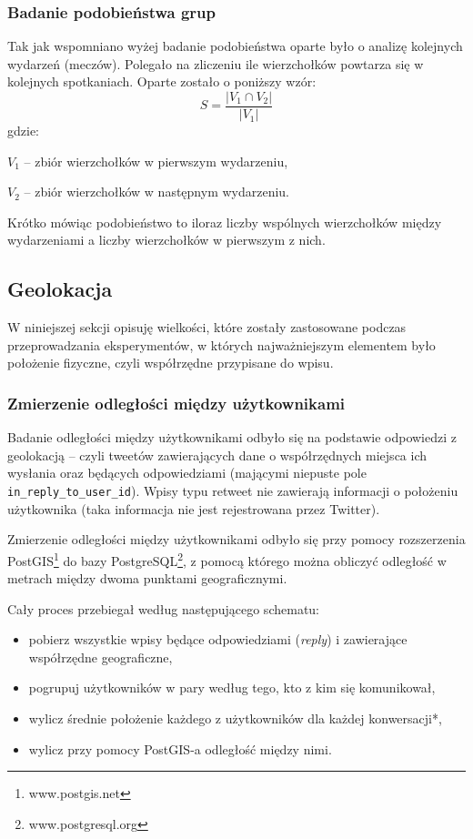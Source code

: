 \subsubsection{Badanie podobieństwa grup}
\label{subsection:badaniepodobienstwagrup}
Tak jak wspomniano wyżej badanie podobieństwa oparte było o analizę kolejnych
wydarzeń (meczów).
Polegało na zliczeniu ile wierzchołków powtarza się w kolejnych spotkaniach.
Oparte zostało o poniższy wzór:
\begin{equation}
S = \frac{|V_1 \cap V_2|}{|V_1|}
\end{equation}  
gdzie:

$V_1$ -- zbiór wierzchołków w pierwszym wydarzeniu,

$V_2$ -- zbiór wierzchołków w następnym wydarzeniu.

Krótko mówiąc podobieństwo to iloraz liczby wspólnych wierzchołków między 
wydarzeniami a liczby wierzchołków w pierwszym z nich.







\subsection{Geolokacja}
W niniejszej sekcji opisuję wielkości, które zostały zastosowane podczas
przeprowadzania eksperymentów, w których najważniejszym elementem było położenie
fizyczne, czyli współrzędne przypisane do wpisu.

\subsubsection{Zmierzenie odległości między użytkownikami}
\label{subsubsection:zmierzenieodleglosci}


Badanie odległości między użytkownikami odbyło się na podstawie odpowiedzi z
geolokacją -- czyli tweetów zawierających dane o współrzędnych miejsca ich
wysłania oraz będących odpowiedziami (mającymi niepuste pole
\texttt{in\_reply\_to\_user\_id}). Wpisy typu retweet nie zawierają informacji
o położeniu użytkownika (taka informacja nie jest rejestrowana przez Twitter).

Zmierzenie odległości między użytkownikami odbyło się przy pomocy rozszerzenia
PostGIS\footnote{www.postgis.net} do bazy
PostgreSQL\footnote{www.postgresql.org}, z pomocą którego można obliczyć
odległość w metrach między dwoma punktami geograficznymi.

Cały proces przebiegał według następującego schematu:
\begin{itemize}
  \item pobierz wszystkie wpisy będące odpowiedziami (\textit{reply}) i
  zawierające współrzędne geograficzne,
  \item pogrupuj użytkowników w pary według tego, kto z kim się komunikował,
  \item wylicz średnie położenie każdego z użytkowników dla każdej konwersacji*,
  \item wylicz przy pomocy PostGIS-a odległość między nimi.
\end{itemize}

